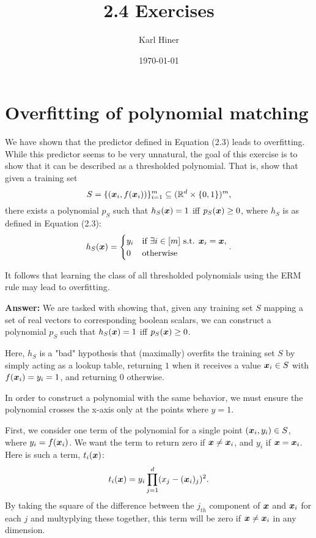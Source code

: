 \documentclass{article}
\title{2.4 Exercises}
\author{Karl Hiner}
\date{\today}
\begin{document}
\maketitle	

\section{Overﬁtting of polynomial matching}
We have shown that the predictor deﬁned in Equation (2.3) leads to overﬁtting.
While this predictor seems to be very unnatural, the goal of this exercise is to show that it can be described as a thresholded polynomial.
That is, show that given a training set
$$S = \{(\bm{x}_i, f(\bm{x}_i))\}^m_{i=1} \subseteq (\mathbb{R}^d \times \{0,1\})^m,$$
there exists a polynomial $p_S$ such that $h_S(\bm{x}) = 1$ iff $p_S(\bm{x}) \geq 0$, where $h_S$ is as deﬁned in Equation (2.3):
$$h_S(\bm{x}) = \begin{cases}
    y_i & \text{if } \exists i \in [m] \text{ s.t. } \bm{x}_i = \bm{x},\\
    0 & \text{otherwise}
\end{cases}.$$

It follows that learning the class of all thresholded polynomials using the ERM rule may lead to overﬁtting.

\textbf{Answer:} We are tasked with showing that, given any training set $S$ mapping a set of real vectors to corresponding boolean scalars, we can construct a polynomial $p_S$ such that $h_S(\bm{x}) = 1$ iff $p_S(\bm{x}) \geq 0$.

Here, $h_S$ is a "bad" hypothesis that (maximally) overfits the training set $S$ by simply acting as a lookup table, returning $1$ when it receives a value $\bm{x}_i \in S$ with $f(\bm{x}_i) = y_i = 1$, and returning $0$ otherwise.

In order to construct a polynomial with the same behavior, we must ensure the polynomial crosses the x-axis only at the points where $y=1$.

First, we consider one term of the polynomial for a single point $(\bm{x}_i, y_i) \in S$, where $y_i = f(\bm{x}_i)$.
We want the term to return zero if $\bm{x} \neq \bm{x}_i$, and $y_i$ if $\bm{x} = \bm{x}_i$.
Here is such a term, $t_i(\bm{x})$:
$$t_i(\bm{x}) = y_i \prod_{j=1}^{d} (x_j - (\bm{x}_i)_j)^2.$$
By taking the square of the difference between the $j_{th}$ component of $\bm{x}$ and $\bm{x}_i$ for each $j$ and multyplying these together, this term will be zero if $\bm{x} \neq \bm{x}_i$ in any dimension.
\end{document}
